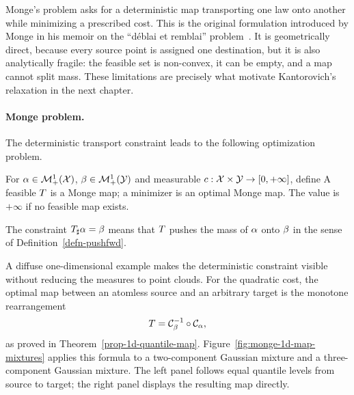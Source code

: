 Monge's problem asks for a deterministic map transporting one law onto another while minimizing a prescribed cost. This is the original formulation introduced by Monge in his memoir on the ``d\'eblai et remblai'' problem~\cite{Monge1781}. It is geometrically direct, because every source point is assigned one destination, but it is also analytically fragile: the feasible set is non-convex, it can be empty, and a map cannot split mass. These limitations are precisely what motivate Kantorovich's relaxation in the next chapter.

\paragraph{Monge problem.}

The deterministic transport constraint leads to the following optimization problem.
\begin{defn}\label{def-monge-problem}
	For $\alpha\in\mathcal{M}_+^1(\mathcal{X})$, $\beta\in\mathcal{M}_+^1(\mathcal{Y})$ and measurable $c:\mathcal{X}\times\mathcal{Y}\to[0,+\infty]$, define
	A feasible $T$ is a Monge map; a minimizer is an optimal Monge map. The value is $+\infty$ if no feasible map exists.
\end{defn}
The constraint $T_\sharp\alpha=\beta$ means that $T$ pushes the mass of $\alpha$ onto $\beta$ in the sense of Definition~\ref{defn-pushfwd}.

A diffuse one-dimensional example makes the deterministic constraint visible without reducing the measures to point clouds. For the quadratic cost, the optimal map between an atomless source and an arbitrary target is the monotone rearrangement
\[
	T=\mathcal{C}_{\beta}^{-1}\circ\mathcal{C}_{\alpha},
\]
as proved in Theorem~\ref{prop-1d-quantile-map}. Figure~\ref{fig:monge-1d-map-mixtures} applies this formula to a two-component Gaussian mixture and a three-component Gaussian mixture. The left panel follows equal quantile levels from source to target; the right panel displays the resulting map directly.

